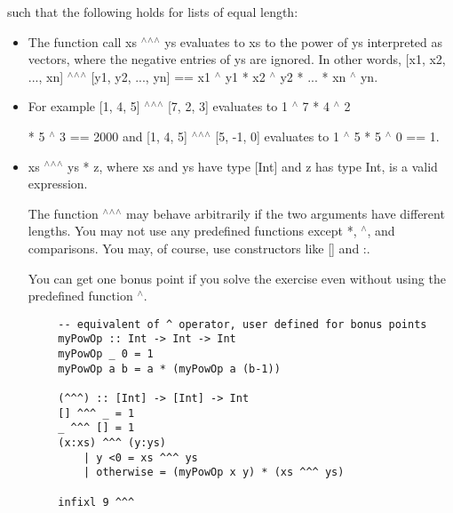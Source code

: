 \documentclass[10pt]{article}
\begin{document}
such that the following holds for lists of equal length:
\begin{itemize}
	\item The function call xs $^\wedge$$^\wedge$$^\wedge$ ys evaluates to xs to the power of ys interpreted as vectors, where the negative
entries of ys are ignored. In other words, [x1, x2, ..., xn] $^\wedge$$^\wedge$$^\wedge$ [y1, y2, ..., yn] == x1 $^\wedge$ y1
* x2 $^\wedge$ y2 * ... * xn $^\wedge$ yn.
	
	\item For example [1, 4, 5] $^\wedge$$^\wedge$$^\wedge$ [7, 2, 3] evaluates to 1 $^\wedge$ 7 * 4 $^\wedge$ 2

	* 5 $^\wedge$ 3 == 2000 and [1, 4, 5] $^\wedge$$^\wedge$$^\wedge$ [5, -1, 0] evaluates to 1 $^\wedge$ 5 * 5 $^\wedge$ 0 == 1.
	
	\item xs $^\wedge$$^\wedge$$^\wedge$ ys * z, where xs and ys have type [Int] and z has type Int, is a valid expression.

	The function $^\wedge$$^\wedge$$^\wedge$ may behave arbitrarily if the two arguments have different lengths. You may not use any
predefined functions except *, $^\wedge$, and comparisons. You may, of course, use constructors like [] and :.

	You can get one bonus point if you solve the exercise even without using the predefined function $^\wedge$.
\end{itemize}

\bigskip

	\begin{addmargin}[0em]{2em}
		\begin{lstlisting}
		-- equivalent of ^ operator, user defined for bonus points
		myPowOp :: Int -> Int -> Int
		myPowOp _ 0 = 1
		myPowOp a b = a * (myPowOp a (b-1))
		
		(^^^) :: [Int] -> [Int] -> Int
		[] ^^^ _ = 1
		_ ^^^ [] = 1
		(x:xs) ^^^ (y:ys)
		    | y <0 = xs ^^^ ys
		    | otherwise = (myPowOp x y) * (xs ^^^ ys)
		
		infixl 9 ^^^
		\end{lstlisting}
	\end{addmargin}
\end{document}
